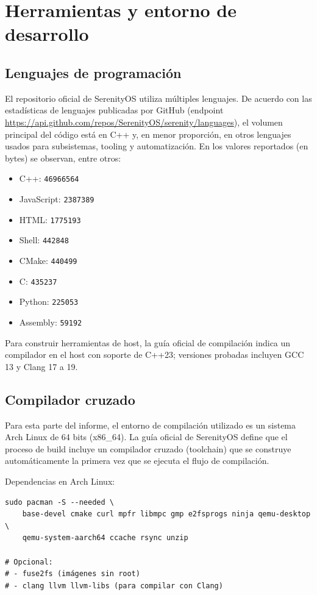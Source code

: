 
\section{Herramientas y entorno de desarrollo}
\subsection{Lenguajes de programación}
El repositorio oficial de SerenityOS utiliza múltiples lenguajes. De acuerdo con las estadísticas de lenguajes publicadas por GitHub (endpoint \url{https://api.github.com/repos/SerenityOS/serenity/languages}), el volumen principal del código está en C++ y, en menor proporción, en otros lenguajes usados para subsistemas, tooling y automatización. En los valores reportados (en bytes) se observan, entre otros:

\begin{itemize}
		\item C++: \texttt{46966564}
		\item JavaScript: \texttt{2387389}
		\item HTML: \texttt{1775193}
		\item Shell: \texttt{442848}
		\item CMake: \texttt{440499}
		\item C: \texttt{435237}
		\item Python: \texttt{225053}
		\item Assembly: \texttt{59192}
\end{itemize}

Para construir herramientas de host, la guía oficial de compilación indica un compilador en el host con soporte de C++23; versiones probadas incluyen GCC 13 y Clang 17 a 19.

\subsection{Compilador cruzado}
Para esta parte del informe, el entorno de compilación utilizado es un sistema Arch Linux de 64 bits (x86\_64). La guía oficial de SerenityOS define que el proceso de build incluye un compilador cruzado (toolchain) que se construye automáticamente la primera vez que se ejecuta el flujo de compilación.

Dependencias en Arch Linux:

\begin{verbatim}
sudo pacman -S --needed \
	base-devel cmake curl mpfr libmpc gmp e2fsprogs ninja qemu-desktop \
	qemu-system-aarch64 ccache rsync unzip

# Opcional:
# - fuse2fs (imágenes sin root)
# - clang llvm llvm-libs (para compilar con Clang)
\end{verbatim}

